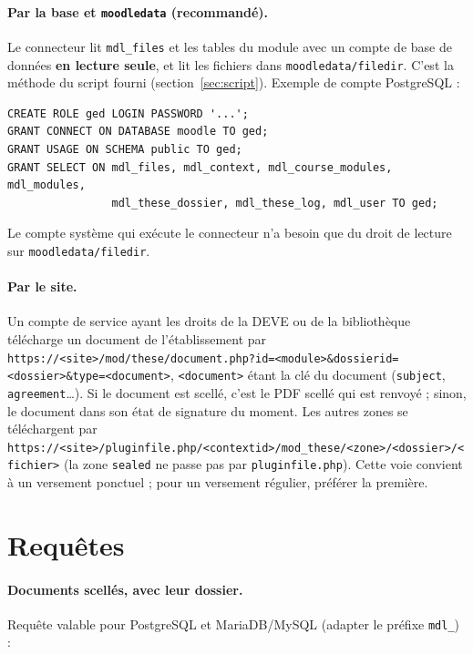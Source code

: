 \documentclass[11pt,a4paper]{article}
\begin{document}
\paragraph{Par la base et \texttt{moodledata} (recommandé).} Le connecteur lit
\texttt{mdl\_files} et les tables du module avec un compte de base de données \textbf{en lecture seule},
et lit les fichiers dans \texttt{moodledata/filedir}. C'est la méthode du script fourni
(section~\ref{sec:script}). Exemple de compte PostgreSQL :

\begin{Verbatim}
CREATE ROLE ged LOGIN PASSWORD '...';
GRANT CONNECT ON DATABASE moodle TO ged;
GRANT USAGE ON SCHEMA public TO ged;
GRANT SELECT ON mdl_files, mdl_context, mdl_course_modules, mdl_modules,
                mdl_these_dossier, mdl_these_log, mdl_user TO ged;
\end{Verbatim}

Le compte système qui exécute le connecteur n'a besoin que du droit de lecture sur
\texttt{moodledata/filedir}.

\paragraph{Par le site.} Un compte de service ayant les droits de la DEVE ou de la bibliothèque
télécharge un document de l'établissement par
\nolinkurl{https://<site>/mod/these/document.php?id=<module>&dossierid=<dossier>&type=<document>},
\texttt{<document>} étant la clé du document (\texttt{subject}, \texttt{agreement}\ldots). Si le
document est scellé, c'est le PDF scellé qui est renvoyé ; sinon, le document dans son état de signature
du moment. Les autres zones se téléchargent par
\nolinkurl{https://<site>/pluginfile.php/<contextid>/mod_these/<zone>/<dossier>/<fichier>} (la zone
\texttt{sealed} ne passe pas par \texttt{pluginfile.php}). Cette voie convient à un versement ponctuel ;
pour un versement régulier, préférer la première.

\section{Requêtes}\label{sec:requetes}

\paragraph{Documents scellés, avec leur dossier.} Requête valable pour PostgreSQL et MariaDB/MySQL
(adapter le préfixe \texttt{mdl\_}) :
\end{document}
